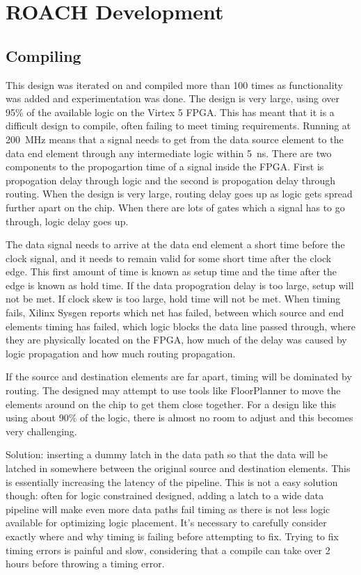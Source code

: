 \chapter{ROACH Development}
\label{appendix:roach-development}
\graphicspath{{./img/roach-dev/}}

\section{Compiling}
This design was iterated on and compiled more than 100 times as functionality was added and experimentation was done.
The design is very large, using over 95\% of the available logic on the Virtex 5 FPGA. This has meant that it is a difficult design to compile, often failing to meet timing requirements.
Running at \SI{200}{\mega\hertz} means that a signal needs to get from the data source element to the data end element through any intermediate logic within \SI{5}{\nano\second}. 
There are two components to the propogartion time of a signal inside the FPGA. First is propogation delay through logic and the second is propogation delay through routing. When the design is very large, routing delay goes up as logic gets spread further apart on the chip. When there are lots of gates which a signal has to go through, logic delay goes up. 

The data signal needs to arrive at the data end element a short time before the clock signal, and it needs to remain valid for some short time after the clock edge. This first amount of time is known as setup time and the time after the edge is known as hold time. If the data propogration delay is too large, setup will not be met. If clock skew is too large, hold time will not be met.
When timing fails, Xilinx Sysgen reports which net has failed, between which source and end elements timing has failed, which logic blocks the data line passed through, where they are physically located on the FPGA, how much of the delay was caused by logic propagation and how much routing propagation. 

If the source and destination elements are far apart, timing will be dominated by routing. The designed may attempt to use tools like FloorPlanner to move the elements around on the chip to get them close together. For a design like this using about 90\% of the logic, there is almost no room to adjust and this becomes very challenging. 

Solution: inserting a dummy latch in the data path so that the data will be latched in somewhere between the original source and destination elements. This is essentially increasing the latency of the pipeline. This is not a easy solution though: often for logic constrained designed, adding a latch to a wide data pipeline will make even more data paths fail timing as there is not less logic available for optimizing logic placement. It's necessary to carefully consider exactly where and why timing is failing before attempting to fix. Trying to fix timing errors is painful and slow, considering that a compile can take over 2 hours before throwing a timing error. 

